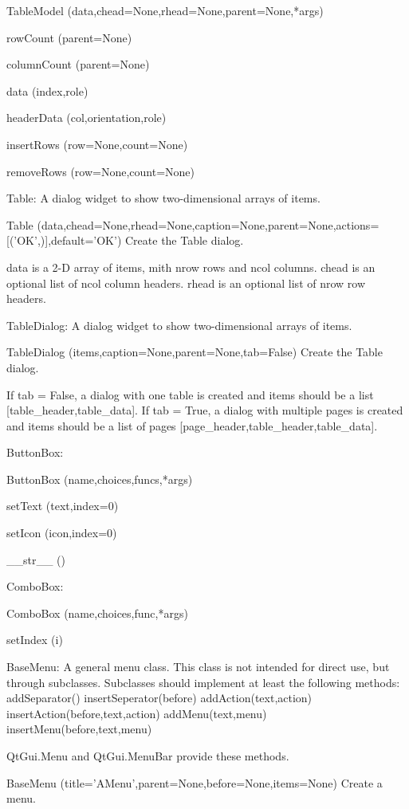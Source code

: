 TableModel (data,chead=None,rhead=None,parent=None,*args)


rowCount (parent=None)


columnCount (parent=None)


data (index,role)


headerData (col,orientation,role)


insertRows (row=None,count=None)


removeRows (row=None,count=None)


Table: A dialog widget to show two-dimensional arrays of items.

Table (data,chead=None,rhead=None,caption=None,parent=None,actions=[('OK',)],default='OK')
Create the Table dialog.
        
        data is a 2-D array of items, mith nrow rows and ncol columns.
        chead is an optional list of ncol column headers.
        rhead is an optional list of nrow row headers.
        

TableDialog: A dialog widget to show two-dimensional arrays of items.

TableDialog (items,caption=None,parent=None,tab=False)
Create the Table dialog.
        
        If tab = False, a dialog with one table is created and items
        should be a list [table_header,table_data].
        If tab = True, a dialog with multiple pages is created and items
        should be a list of pages [page_header,table_header,table_data].
        

ButtonBox: 

ButtonBox (name,choices,funcs,*args)


setText (text,index=0)


setIcon (icon,index=0)


__str__ ()


ComboBox: 

ComboBox (name,choices,func,*args)


setIndex (i)


BaseMenu: A general menu class.
    This class is not intended for direct use, but through subclasses.
    Subclasses should implement at least the following methods:
      addSeparator()              insertSeperator(before)
      addAction(text,action)      insertAction(before,text,action)
      addMenu(text,menu)          insertMenu(before,text,menu)
      
    QtGui.Menu and QtGui.MenuBar provide these methods.
    
BaseMenu (title='AMenu',parent=None,before=None,items=None)
Create a menu.

